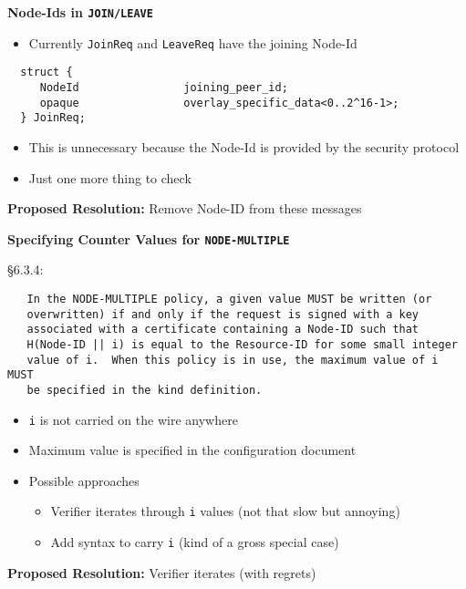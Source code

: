 \documentclass[helvetica]{seminar}
\newcommand{\heading}[1]{%
  \begin{center} 
    \large\bf 
    #1 
  \end{center} 
  \vspace{.4 in}}
\begin{document}
\begin{slide}
\heading{Node-Ids in \texttt{JOIN/LEAVE}}

\begin{itemize}
\item Currently \verb^JoinReq^ and \verb^LeaveReq^ have the joining 
  Node-Id
\end{itemize}

{\footnotesize
\begin{verbatim}
  struct {
     NodeId                joining_peer_id;
     opaque                overlay_specific_data<0..2^16-1>;
  } JoinReq;
\end{verbatim}
}

\begin{itemize}
\item This is unnecessary because the Node-Id is provided by the security protocol
\item Just one more thing to check
\end{itemize}

\vspace{1em}
\textbf{Proposed Resolution:} Remove Node-ID from these messages
\end{slide}



\begin{slide}
\heading{Specifying Counter Values for \texttt{NODE-MULTIPLE}}


\vspace{-2em}
\S 6.3.4:

{\footnotesize
\begin{verbatim}
   In the NODE-MULTIPLE policy, a given value MUST be written (or
   overwritten) if and only if the request is signed with a key
   associated with a certificate containing a Node-ID such that
   H(Node-ID || i) is equal to the Resource-ID for some small integer
   value of i.  When this policy is in use, the maximum value of i MUST
   be specified in the kind definition.
\end{verbatim}
}

\begin{itemize}
\item \verb^i^ is not carried on the wire anywhere
\item Maximum value is specified in the configuration document
\item Possible approaches
\begin{itemize}
\item Verifier iterates through \verb^i^ values (not that slow but annoying)
\item Add syntax to carry \verb^i^ (kind of a gross special case)
\end{itemize}
\end{itemize}

\vspace{1em}
\textbf{Proposed Resolution:} Verifier iterates (with regrets)
\end{slide}
\end{document}
